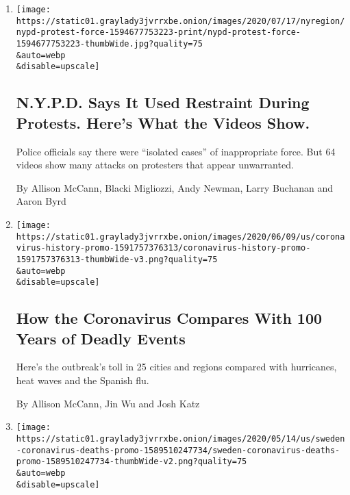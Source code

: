 \begin{enumerate}
\def\labelenumi{\arabic{enumi}.}
\item
  \href{/interactive/2020/07/14/nyregion/nypd-george-floyd-protests.html}{}

  \texttt{[image: https://static01.graylady3jvrrxbe.onion/images/2020/07/17/nyregion/nypd-protest-force-1594677753223-print/nypd-protest-force-1594677753223-thumbWide.jpg?quality=75\\\&auto=webp\\\&disable=upscale]}

  \hypertarget{nypd-says-it-used-restraint-during-protests-heres-what-the-videos-show}{%
  \subsection{N.Y.P.D. Says It Used Restraint During Protests. Here's
  What the Videos
  Show.}\label{nypd-says-it-used-restraint-during-protests-heres-what-the-videos-show}}

  Police officials say there were ``isolated cases'' of inappropriate
  force. But 64 videos show many attacks on protesters that appear
  unwarranted.

  By Allison McCann, Blacki Migliozzi, Andy Newman, Larry Buchanan and
  Aaron Byrd
\item
  \href{/interactive/2020/06/10/world/coronavirus-history.html}{}

  \texttt{[image: https://static01.graylady3jvrrxbe.onion/images/2020/06/09/us/coronavirus-history-promo-1591757376313/coronavirus-history-promo-1591757376313-thumbWide-v3.png?quality=75\\\&auto=webp\\\&disable=upscale]}

  \hypertarget{how-the-coronavirus-compares-with-100-years-of-deadly-events}{%
  \subsection{How the Coronavirus Compares With 100 Years of Deadly
  Events}\label{how-the-coronavirus-compares-with-100-years-of-deadly-events}}

  Here's the outbreak's toll in 25 cities and regions compared with
  hurricanes, heat waves and the Spanish flu.

  By Allison McCann, Jin Wu and Josh Katz
\item
  \href{/interactive/2020/05/15/world/europe/sweden-coronavirus-deaths.html}{}

  \texttt{[image: https://static01.graylady3jvrrxbe.onion/images/2020/05/14/us/sweden-coronavirus-deaths-promo-1589510247734/sweden-coronavirus-deaths-promo-1589510247734-thumbWide-v2.png?quality=75\\\&auto=webp\\\&disable=upscale]}


\end{enumerate}

